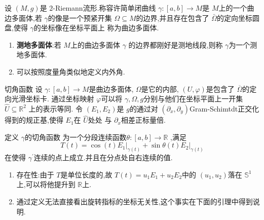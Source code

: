 \documentclass[../../main.tex]{subfiles}
\begin{document}
\begin{definition}
    设 \(  \left( M,g \right)   \)是 \(  2  \)-Riemann流形.称容许简单闭曲线 \(   \gamma :\left[ a,b \right]\to M   \)是 \(  M  \)上的一个曲边多面体,若 \(   \gamma   \)的像是一个预紧开集 \(   \Omega \subseteq M  \)的边界,并且存在包含了 \(   \bar{\Omega}  \)的定向坐标圆盘,使得 \(   \gamma   \)的坐标像在坐标平面上 称为曲边多面体.    
\end{definition}
\begin{remark}
    \begin{enumerate}
        \item \textbf{测地多面体}:若 \(  M  \)上的曲边多面体 \(   \gamma   \) 的边界都刚好是测地线段,则称 \(  \gamma    \)为一个测地多面体.
        \item 可以按照度量角类似地定义内外角.  
    \end{enumerate}
    
\end{remark}

\begin{definition}{切角函数}
    设 \(   \gamma :\left[ a,b \right]\to M   \)是曲边多面体, \(   \Omega   \)是它的内部, \(  \left( U, \varphi  \right)   \)是包含了 \(  \overline{ \Omega }  \)的定向光滑坐标卡.    通过坐标映射 \(   \varphi   \)可以将 \(   \gamma , \Omega ,g  \)分别与他们在坐标平面上一开集 \(  \hat{U}\subseteq \mathbb{R} ^{2}  \) 上的表示等同.  令 \(  \left( E_1,E_2 \right)   \)是 \(  g  \)的通过对 \(  \left(  \partial _{x}, \partial _{y} \right)   \)Gram-Schimtdt正交化得到的规正基,使得 \(  E_1  \)在 \(  \hat{U}  \)处处 与 \(   \partial _{x}  \)相差正标量倍. 

    定义 \(   \gamma   \)的切角函数 为一个分段连续函数\(   \theta :\left[ a,b \right]\to \mathbb{R}    \) ,满足 \[
    T\left( t \right)= \cos \left( t \right)\left. E_1 \right|_{ \gamma \left( t \right) }+ \sin  \theta \left( t \right)\left. E_2 \right|_{ \gamma \left( t \right) }   
    \]在使得 \(   \gamma ^{\prime}   \)连续的点上成立.并且在分点处自右连续的值. 
\end{definition}
\begin{remark}
    \begin{enumerate}
        \item 存在性:由于 \(  T  \)是单位长度的,故 \(  T\left( t \right)= u_1E_1+ u_2E_2   \)中的 \(  \left( u_1,u_2 \right)   \)落在 \(  \mathbb{S}^{1}  \)上,可以将他提升到 \(  \mathbb{R}   \)上.
        \item 通过定义无法直接看出旋转指标的坐标无关性,这个事实在下面的引理中得到说明.     
    \end{enumerate}
    
\end{remark}
\end{document}
